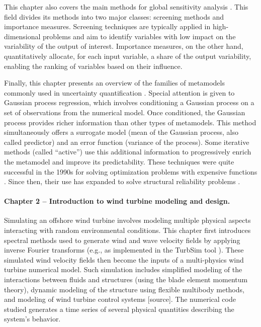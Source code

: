 This chapter also covers the main methods for global sensitivity analysis \citep{daveiga_iooss_2021}. 
This field divides its methods into two major classes: screening methods and importance measures. 
Screening techniques are typically applied in high-dimensional problems and aim to identify variables with low impact on the variability of the output of interest. 
Importance measures, on the other hand, quantitatively allocate, for each input variable, a share of the output variability, enabling the ranking of variables based on their influence.

Finally, this chapter presents an overview of the families of metamodels commonly used in uncertainty quantification \citep{forrester_2008}. 
Special attention is given to Gaussian process regression, which involves conditioning a Gaussian process on a set of observations from the numerical model. 
Once conditioned, the Gaussian process provides richer information than other types of metamodels. 
This method simultaneously offers a surrogate model (mean of the Gaussian process, also called predictor) and an error function (variance of the process). 
Some iterative methods (called ``active'') use this additional information to progressively enrich the metamodel and improve its predictability. 
These techniques were quite successful in the 1990s for solving optimization problems with expensive functions \citep{jones_1998}. 
Since then, their use has expanded to solve structural reliability problems \citep{echard_2011}.


\paragraph{Chapter 2 -- Introduction to wind turbine modeling and design.} 
Simulating an offshore wind turbine involves modeling multiple physical aspects interacting with random environmental conditions. 
This chapter first introduces spectral methods used to generate wind and wave velocity fields by applying inverse Fourier transforms (e.g., as implemented in the TurbSim tool \citealp{turbsim_2009}). 
These simulated wind velocity fields then become the inputs of a multi-physics wind turbine numerical model. 
Such simulation includes simplified modeling of the interactions between fluids and structures (using the blade element momentum theory), dynamic modeling of the structure using flexible multibody methods, and modeling of wind turbine control systems [source]. 
The numerical code studied generates a time series of several physical quantities describing the system's behavior.

